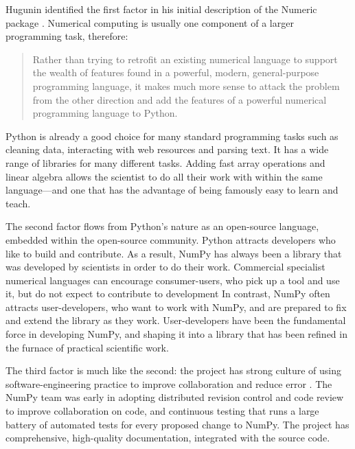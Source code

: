 Hugunin identified the first factor in his initial description of the Numeric
package \cite{Hugunin-whitepaper}.  Numerical computing is usually one
component of a larger programming task, therefore:
\begin{quote}
    Rather than trying to retrofit an existing numerical language to support
    the wealth of features found in a powerful, modern, general-purpose
    programming language, it makes much more sense to attack the problem from
    the other direction and add the features of a powerful numerical
    programming language to Python.
\end{quote}
Python is already a good choice for many standard programming tasks such as
cleaning data, interacting with web resources and parsing text.  It has a wide
range of libraries for many different tasks. Adding fast array operations and
linear algebra allows the scientist to do all their work with within the same
language---and one that has the advantage of being famously easy to learn and
teach.

The second factor flows from Python's nature as an open-source language,
embedded within the open-source community.  Python attracts developers who like
to build and contribute.  As a result, NumPy has always been a library that was
developed by scientists in order to do their work.  Commercial specialist
numerical languages can encourage consumer-users, who pick up a tool and use
it, but do not expect to contribute to development%
In contrast, NumPy often
attracts user-developers, who want to work with NumPy, and are prepared to fix
and extend the library as they work. User-developers have been the fundamental
force in developing NumPy, and shaping it into a library that has been refined
in the furnace of practical scientific work.

The third factor is much like the second: 
the project has strong culture of using software-engineering practice to
improve collaboration and reduce error \cite{millman2014developing}.
The NumPy team was early in adopting distributed
revision control and code review to improve collaboration on code, and
continuous testing that runs a large battery of automated tests for every proposed
change to NumPy.
The project has comprehensive, high-quality documentation,
integrated with the source
code\cite{vanderwalt2008scipy,harrington2008scipy,harrington2009scipy}. 

